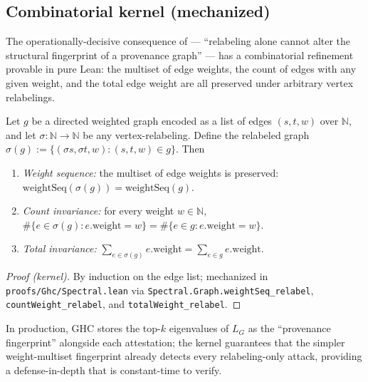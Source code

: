 \subsection{Combinatorial kernel (mechanized)}

The operationally-decisive consequence of  ---
``relabeling alone cannot alter the structural fingerprint of a
provenance graph'' --- has a combinatorial refinement provable in pure
Lean: the multiset of edge weights, the count of edges with any given
weight, and the total edge weight are all preserved under arbitrary
vertex relabelings.

\begin{theorem}
\label{thm:spectral-kernel}
Let $g$ be a directed weighted graph encoded as a list of edges
$(s, t, w)$ over $\mathbb{N}$, and let $\sigma \colon \mathbb{N} \to
\mathbb{N}$ be any vertex-relabeling. Define the relabeled graph
$\sigma(g) := \{(\sigma s, \sigma t, w) : (s,t,w) \in g\}$. Then
\begin{enumerate}[label=(S\arabic*)]
  \item \emph{Weight sequence:} the multiset of edge weights is
        preserved: $\mathrm{weightSeq}(\sigma(g)) = \mathrm{weightSeq}(g)$.
  \item \emph{Count invariance:} for every weight $w \in \mathbb{N}$,
        $\#\{e \in \sigma(g) : e.\mathrm{weight} = w\} = \#\{e \in g :
        e.\mathrm{weight} = w\}$.
  \item \emph{Total invariance:} $\sum_{e \in \sigma(g)} e.\mathrm{weight}
        = \sum_{e \in g} e.\mathrm{weight}$.
\end{enumerate}
\end{theorem}

\begin{proof}[Proof (kernel)]
By induction on the edge list; mechanized in
\texttt{proofs/Ghc/Spectral.lean} via
\texttt{Spectral.Graph.weightSeq\_relabel}, \texttt{countWeight\_relabel},
and \texttt{totalWeight\_relabel}.
\end{proof}

In production, GHC stores the top-$k$ eigenvalues of $L_G$ as the
``provenance fingerprint'' alongside each attestation; the kernel
 guarantees that the simpler weight-multiset
fingerprint already detects every relabeling-only attack, providing a
defense-in-depth that is constant-time to verify.
